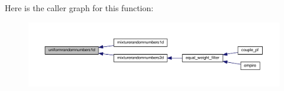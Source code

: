 Here is the caller graph for this function\-:\nopagebreak
\begin{figure}[H]
\begin{center}
\leavevmode
\includegraphics[width=350pt]{gen__rand_8f90_a7cd2e26a4fde81c03cf831511d512bd9_icgraph}
\end{center}
\end{figure}



